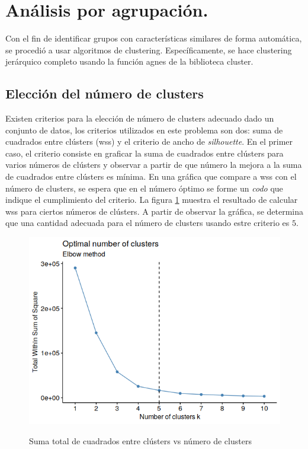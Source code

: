 \pagebreak
\restoregeometry 
\section{Análisis por agrupación.}

Con el fin de identificar grupos con características similares de forma automática, se procedió a usar algoritmos de clustering. Específicamente, se hace clustering jerárquico completo usando la función \textsf{agnes} de la biblioteca \textsf{cluster}. 

\subsection{Elección del número de clusters}

Existen criterios para la elección de número de clusters adecuado dado un conjunto de datos, los criterios utilizados en este problema son dos:  suma de cuadrados entre clústers (wss) y el criterio de ancho de \textit{silhouette}.
En el primer caso, el criterio consiste en graficar la suma de cuadrados entre clústers para varios números de clústers y observar a partir de que número la mejora a la suma de cuadrados entre clústers es mínima. En una gráfica que compare a wss con el número de clusters, se espera que en el número óptimo se forme un \textit{codo} que indique el cumplimiento del criterio. La figura \ref{i_cluster_Elbow} muestra el resultado de calcular wss para ciertos números de clústers. A partir de observar la gráfica, se determina que una cantidad adecuada para el número de clusters usando estre criterio es $5$.


\begin{figure}[h]
\centering
	\includegraphics[scale=.5]{images/clusterElbow.png} 
	\label{i_cluster_Elbow}
	\caption{Suma total de cuadrados entre clústers vs número de clusters}
\end{figure}


